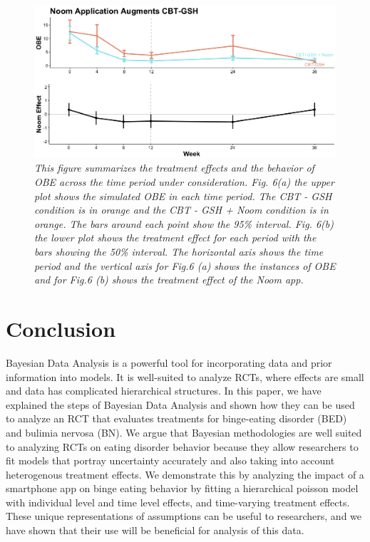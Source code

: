 \documentclass{article}
\begin{document}
\begin{figure}[H]
\begin{center}
\includegraphics[width=\textwidth, height=\textheight, keepaspectratio]{noom_effect.png}
\caption{\emph{This figure summarizes the treatment effects and the behavior of OBE across the time period under consideration. Fig. 6(a) the upper plot shows the simulated OBE in each time period. The CBT - GSH condition is in orange and the CBT - GSH + Noom condition is in orange. The bars around each point show the 95\% interval. Fig. 6(b) the lower plot shows the treatment effect for each period with the bars showing the 50\% interval. The horizontal axis shows the time period and the vertical axis for Fig.6 (a) shows the instances of OBE and for Fig.6 (b) shows the treatment effect of the Noom app.}}
\end{center}
\end{figure}


\section{Conclusion}
Bayesian Data Analysis is a powerful tool for incorporating data and prior information into models.  It is well-suited to analyze RCTs, where effects are small and data has complicated hierarchical structures.  In this paper, we have explained the steps of Bayesian Data Analysis and shown how they can be used to analyze an RCT that evaluates treatments for binge-eating disorder (BED) and bulimia nervosa (BN).  We argue that Bayesian methodologies are well suited to analyzing RCTs on eating disorder behavior because they allow researchers to fit models that portray uncertainty accurately and also taking into account heterogenous treatment effects. We demonstrate this by analyzing the impact of a smartphone app on binge eating behavior by fitting a hierarchical poisson model with individual level and time level effects, and time-varying treatment effects.  These unique representations of assumptions can be useful to researchers, and we have shown that their use will be beneficial for analysis of this data.
\end{document}
